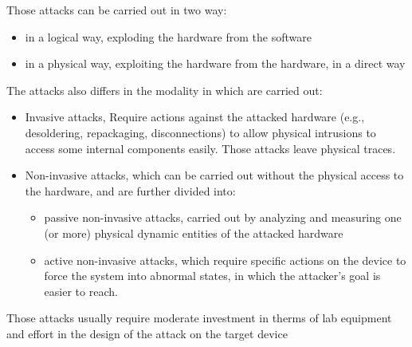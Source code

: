 Those attacks can be carried out in two way:
\begin{itemize}
  \item in a logical way, exploding the hardware from the software
  \item in a physical way, exploiting the hardware from the hardware, in a direct way
\end{itemize}

The attacks also differs in the modality in which are carried out:
\begin{itemize}
  \item Invasive attacks, Require actions against the attacked hardware (e.g., desoldering,
    repackaging, disconnections) to allow physical intrusions to access some internal components
    easily. Those attacks leave physical traces.
  \item Non-invasive attacks, which can be carried out without the physical access to the hardware,
    and are further divided into:
    \begin{itemize}
      \item passive non-invasive attacks, carried out by analyzing and measuring one (or more)
        physical dynamic entities of the attacked hardware
      \item active non-invasive attacks, which require specific actions on the device to force the
        system into abnormal states, in which the attacker’s goal is easier to reach.
    \end{itemize}
\end{itemize}
Those attacks usually require moderate investment in therms of lab equipment and effort in the
design of the attack on the target device

